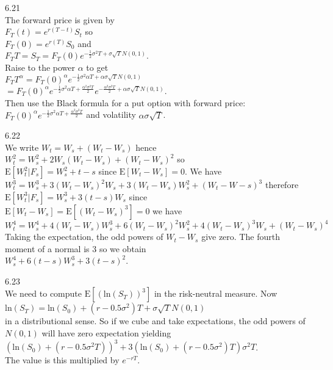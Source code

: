 6.21 \\
The forward price is given by \\
$F_T (t) = e^{r(T-t)} S_t$ so \\
$F_T (0)=e^{r(T)} S_0$ and \\
$F_T T = S_T = F_T (0) e^{-\frac{1}{2} \sigma^2 T + \sigma \sqrt{T} N(0,1)}$. \\
Raise to the power $\alpha$ to get \\
$F_T T^{\alpha} = F_T (0)^{\alpha} e^{-\frac{1}{2} \sigma^2 \alpha T + \alpha \sigma \sqrt{T} N(0,1)}$ \\
$=F_T (0)^{\alpha} e^{-\frac{1}{2}\sigma^2 \alpha T + \frac{\alpha^2 \sigma^2 T}{2}} e^{-\frac{\alpha^2 \sigma^2 T}{2} + \alpha \sigma \sqrt{T} N(0,1)}$. \\
Then use the Black formula for a put option with forward price: \\
$F_T (0)^{\alpha} e^{-\frac{1}{2} \sigma^2 \alpha T + \frac{\alpha^2 \sigma^2 T}{2}}$ and volatility $\alpha \sigma \sqrt{T}$.

6.22 \\
We write $W_t = W_s + (W_t-W_s)$ hence \\
$W_t^2 = W_s^2 + 2 W_s (W_t - W_s) + (W_t - W_s)^2$ so \\
$\text{E}[W_t^2 | F_s] = W_s^2 + t -s$ since $\text{E}[W_t - W_s]=0$. We have \\
$W_t^3 = W_s^3 + 3 (W_t - W_s)^2 W_s + 3 (W_t - W_s)W_s^2 + (W_t - W-s)^3$ therefore \\
$\text{E}[W_t^3 | F_s] = W_s^3 + 3(t-s)W_s$ since \\
$\text{E}[W_t - W_s]=\text{E}[(W_t - W_s)^3]=0$ we have \\
$W_t^4 = W_s^4 + 4(W_t - W_s)W_s^3 + 6 (W_t - W_s)^2 W_s^2 + 4 (W_t-W_s)^3 W_s + (W_t - W_s)^4$ \\
Taking the expectation, the odd powers of $W_t - W_s$ give zero. The fourth moment of a normal is $3$ so we obtain \\
$W_s^4 + 6(t-s)W_s^3 + 3(t-s)^2$.

6.23 \\
We need to compute $\text{E}[(\text{ln}(S_T))^3]$ in the risk-neutral measure. Now \\
$\text{ln}(S_T) = \text{ln} (S_0) + (r-0.5 \sigma^2) T + \sigma \sqrt{T} N(0,1)$ \\
in a distributional sense. So if we cube and take expectations, the odd powers of $N(0,1)$ will have zero expectation yielding \\
$(\text{ln}(S_0) + (r - 0.5 \sigma^2 T))^3 + 3 (\text{ln}(S_0) + (r-0.5 \sigma^2) T ) \sigma^2 T$. \\
The value is this multiplied by $e^{-rT}$.

